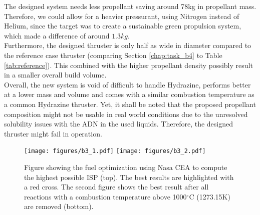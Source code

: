 \documentclass[12pt]{article}
\begin{document}
The designed system needs less propellant saving around 78kg in propellant mass. Therefore, we could allow for a heavier pressurant, using Nitrogen instead of Helium, since the target was to create a sustainable green propulsion system, which made a difference of around $1.3kg$.\\

Furthermore, the designed thruster is only half as wide in diameter compared to the reference case thruster (comparing Section \ref{chap:task_b4} to Table \ref{tab:reference}). This combined with the higher propellant density possibly result in a smaller overall build volume.\\

Overall, the new system is void of difficult to handle Hydrazine, performs better at a lower mass and volume and comes with a similar combustion temperature as a common Hydrazine thruster. Yet, it shall be noted that the proposed propellant composition might not be usable in real world conditions due to the unresolved solubility issues with the ADN in the used liquids. Therefore, the designed thruster might fail in operation.


\newpage
\begin{figure}[!h]
	\centering
	\texttt{[image: figures/b3\_1.pdf]}
	\texttt{[image: figures/b3\_2.pdf]}
	\caption{Figure showing the fuel optimization using Nasa CEA to compute the highest possible ISP (top). The best results are highlighted with a red cross. The second figure shows the best result after all reactions with a combustion temperature above 1000$^\circ$C (1273.15K) are removed (bottom).}
	\label{fig:fuel_optimization_all_results}
\end{figure}
\end{document}

